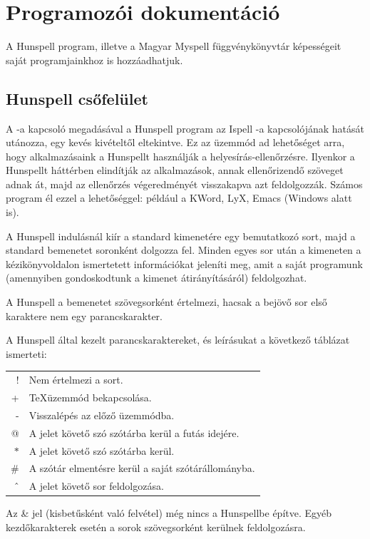 \chapter{Programozói dokumentáció}

A Hunspell program, illetve a Magyar Myspell
függvénykönyvtár képességeit saját programjainkhoz
is hozzáadhatjuk. 

\section{Hunspell csőfelület}

A -a kapcsoló megadásával a Hunspell program az
Ispell -a kapcsolójának hatását utánozza, egy kevés
kivételtől eltekintve. Ez az üzemmód ad lehetőséget
arra, hogy alkalmazásaink a Hunspellt
használják a helyesírás-ellenőrzésre.
Ilyenkor a Hunspellt háttérben elindítják az alkalmazások,
annak ellenőrizendő szöveget adnak át,
majd az ellenőrzés végeredményét visszakapva
azt feldolgozzák.
Számos program él ezzel a lehetőséggel: például
a KWord, LyX, Emacs (Windows alatt is).

A Hunspell indulásnál kiír a standard kimenetére egy
bemutatkozó sort, majd a standard bemenetet
soronként dolgozza fel. Minden egyes sor után a
kimeneten a kézikönyvoldalon ismertetett információkat
jeleníti meg, amit a saját programunk (amennyiben
gondoskodtunk a kimenet átirányításáról) feldolgozhat.

A Hunspell a bemenetet szövegsorként értelmezi,
hacsak a bejövő sor első karaktere nem egy parancskarakter.

A Hunspell által kezelt parancskaraktereket, és
leírásukat a következő táblázat ismerteti:

\begin{tabular}{rl}
! & Nem értelmezi a sort. \\
+ & \TeX üzemmód bekapcsolása. \\
- & Visszalépés az előző üzemmódba. \\
@ & A jelet követő szó szótárba kerül a futás idejére.\\
$*$ & A jelet követő szó szótárba kerül.\\
\# & A szótár elmentésre kerül a saját szótárállományba.\\
\^\ & A jelet követő sor feldolgozása.
\end{tabular}

Az \& jel (kisbetűsként való felvétel) még nincs a Hunspellbe építve.
Egyéb kezdőkarakterek esetén a sorok szövegsorként kerülnek feldolgozásra.


